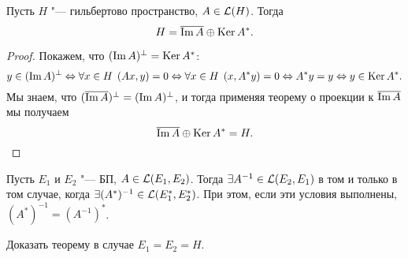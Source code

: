 \documentclass[main]{subfiles}
\begin{document}

\begin{theorem}%
  Пусть $H$ "--- гильбертово пространство,
  \( A \in \Linears{H} \). Тогда
  \[
    H = \overline{\operatorname{Im} A} \oplus \operatorname{Ker} A^*.
  \]
\end{theorem}
\begin{proof}
  Покажем, что $(\operatorname{Im} A)^\perp = \operatorname{Ker} A^*$:
  \[
    y \in (\operatorname{Im} A)^\perp
    \Leftrightarrow \forall {x \in H} \; \, (Ax, y) = 0
    \Leftrightarrow \forall {x \in H} \; \, (x, A^* y) = 0
    \Leftrightarrow A^* y = y
    \Leftrightarrow y \in \operatorname{Ker} A^*.
  \]
  Мы знаем, что
  \( (\overline{\operatorname{Im} A})^\perp = (\operatorname{Im} A)^\perp \),
  и тогда применяя теорему о проекции к \( \overline{\operatorname{Im} A} \)
  мы получаем
  \[
    \overline{\operatorname{Im} A} \oplus \operatorname{Ker} A^* = H. \qedhere
  \]
\end{proof}


\begin{theorem}[б/д]%
  Пусть \( E_1 \) и \( E_2 \) "--- БП,
  \( A \in \Linears{E_1, E_2} \).
  Тогда
  \( \exists A^{-1} \in \Linears{E_2, E_1} \)
  в том и только в том случае,
  когда \( \exists (A^*)^{-1} \in \Linears{E_1^*, E_2^*} \).
  При этом, если эти условия выполнены,
  \( (A^*)^{-1} = (A^{-1})^* \).
\end{theorem}

\begin{exercise}
  Доказать теорему в случае \( E_1 = E_2 = H \).
\end{exercise}
\end{document}
